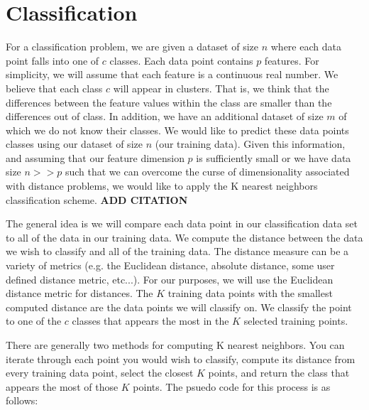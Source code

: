 \chapter{Classification}

\vspace{5 mm}
\noindent
For a classification problem, we are given a dataset of size $n$ where each 
data point falls into one of $c$ classes. Each data point contains $p$ features. 
For simplicity, we will assume that each feature is a continuous real number. 
We believe that each class $c$ will appear in clusters. That is, we think that 
the differences between the feature values within the class are smaller than 
the differences out of class. In addition, we have an additional dataset of 
size $m$ of which we do not know their classes. We would like to predict these 
data points classes using our dataset of size $n$ (our training data). Given 
this information, and assuming that our feature dimension $p$ is sufficiently 
small or we have data size $n >> p$ such that we can overcome the curse of 
dimensionality associated with distance problems, we would like to apply the 
K nearest neighbors classification scheme.
\textbf{ADD CITATION}

\vspace{5 mm}
\noindent
The general idea is we will compare each data point in our classification data 
set to all of the data in our training data. We compute the distance between 
the data we wish to classify and all of the training data. The distance measure 
can be a variety of metrics (e.g. the Euclidean distance, absolute distance, 
some user defined distance metric, etc...). For our purposes, we will use the 
Euclidean distance metric for distances. The $K$ training data points with the 
smallest computed distance are the data points we will classify on. We classify 
the point to one of the $c$ classes that appears the most in the $K$ selected 
training points.

\vspace{5 mm}
\noindent
There are generally two methods for computing K nearest neighbors. You can 
iterate through each point you would wish to classify, compute its distance 
from every training data point, select the closest $K$ points, and return the 
class that appears the most of those $K$ points. The psuedo code for this 
process is as follows:

